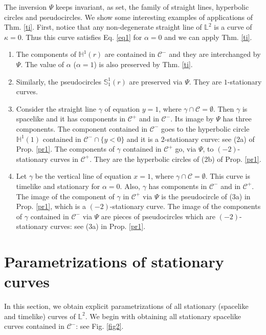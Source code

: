 \documentclass[a4paper,12pt]{amsart}
\theoremstyle{definition}
\def\h{\mathbb H}
\def\l{\mathbb L}
\def\s{\mathbb S}
\begin{document}
The inversion $\Psi$ keeps invariant, as set,  the family of straight lines, hyperbolic circles and pseudocircles. We show some interesting examples of  applications of Thm. \ref{ti}. First, notice that any non-degenerate straight line of $\l^2$ is a curve of $\kappa=0$. Thus this curve satisfies Eq. \eqref{eq1} for $\alpha=0$ and we can apply Thm. \ref{ti}.

 
\begin{enumerate}
\item The components of  $\h^1(r)$ are contained in $\mathcal{C}^-$ and they  are interchanged by $\Psi$. The value of $\alpha $ ($\alpha=1$) is also preserved by Thm. \ref{ti}. 
\item Similarly, the pseudocircles $\s^1_1(r)$ are preserved via $\Psi$. They are $1$-stationary curves.
 \item Consider the straight line $\gamma$ of equation $y=1$, where $\gamma \cap \mathcal{C}=\emptyset$. Then $\gamma$ is spacelike and it has   components in $\mathcal{C}^+$ and in $\mathcal{C}^-$. Its image by $\Psi$ has three components. The component contained in  $\mathcal{C}^-$ goes to the hyperbolic circle $\h^1(1)$ contained in $\mathcal{C}^-\cap\{y<0\}$ and it is a $2$-stationary curve: see (2a) of Prop. \ref{pr1}.  The components of $\gamma$ contained in $\mathcal{C}^+$ go, via $\Psi$, to $(-2)$-stationary  curves in $\mathcal{C}^+$. They are the hyperbolic circles of (2b) of Prop. \ref{pr1}.
\item Let $\gamma$ be the vertical line of equation $x=1$, where $\gamma \cap \mathcal{C}=\emptyset$. This curve is timelike and stationary for $\alpha=0$. Also, $\gamma$ has components in $\mathcal{C}^-$ and in $\mathcal{C}^+$.   The  image of the component of  $\gamma$ in $\mathcal{C}^+$ via $\Psi$ is the pseudocircle of (3a) in Prop. \ref{pr1}, which is a  $(-2)$-stationary curve. The image of the components of $\gamma$ contained in $\mathcal{C}^-$ via $\Psi$ are  pieces of pseudocircles which are $(-2)$-stationary curves: see (3a) in Prop. \ref{pr1}.
\end{enumerate}

\section{Parametrizations of stationary   curves}\label{s4}


In this section, we obtain explicit parametrizations of all stationary (spacelike and timelike) curves of $\l^2$.
 We begin with obtaining all stationary spacelike curves contained in $\mathcal{C}^-$: see Fig. \ref{fig2}.
\end{document}
